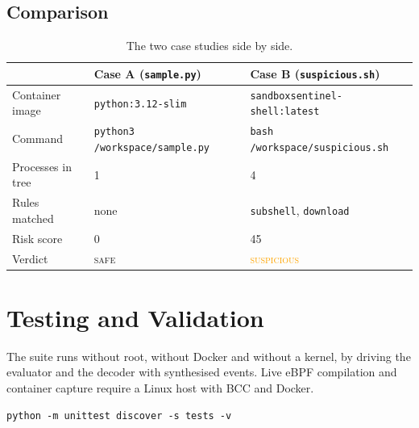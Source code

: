 \documentclass[11pt,a4paper]{article}
\newcommand{\code}[1]{\texttt{\small #1}}
\newcommand{\file}[1]{\texttt{\small #1}}
\begin{document}
\subsection{Comparison}
\begin{table}[H]
\centering\footnotesize
\begin{tabular}{@{}lll@{}}
\toprule
 & \textbf{Case A (\file{sample.py})} & \textbf{Case B (\file{suspicious.sh})} \\
\midrule
Container image   & \code{python:3.12-slim} & \code{sandboxsentinel-shell:latest} \\
Command           & \code{python3 /workspace/sample.py} & \code{bash /workspace/suspicious.sh} \\
Processes in tree  & 1 & 4 \\
Rules matched      & none & \code{subshell}, \code{download} \\
Risk score         & 0 & 45 \\
Verdict            & \textcolor{boxsafe}{\textsc{safe}} & \textcolor{orange}{\textsc{suspicious}} \\
\bottomrule
\end{tabular}
\caption{The two case studies side by side.}
\end{table}

\section{Testing and Validation}

The suite runs without root, without Docker and without a kernel, by driving the
evaluator and the decoder with synthesised events. Live eBPF compilation and
container capture require a Linux host with BCC and Docker.

\begin{lstlisting}[style=term]
python -m unittest discover -s tests -v
\end{lstlisting}
\end{document}
